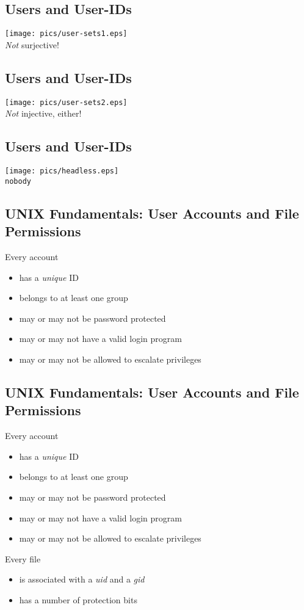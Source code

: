 \documentclass[xga]{xdvislides}
\begin{document}
\subsection{Users and User-IDs}
\begin{center}
	\texttt{[image: pics/user-sets1.eps]} \\
	{\em Not} surjective!
\end{center}

\subsection{Users and User-IDs}
\begin{center}
	\texttt{[image: pics/user-sets2.eps]} \\
	{\em Not} injective, either!
\end{center}

\subsection{Users and User-IDs}

\begin{center}
	\texttt{[image: pics/headless.eps]} \\
	{\tt nobody}
\end{center}

\subsection{UNIX Fundamentals: User Accounts and File Permissions}
Every account
\begin{itemize}
	\item has a {\em unique} ID
	\item belongs to at least one group
	\item may or may not be password protected
	\item may or may not have a valid login program
	\item may or may not be allowed to escalate privileges
\end{itemize}

\subsection{UNIX Fundamentals: User Accounts and File Permissions}
Every account
\begin{itemize}
	\item has a {\em unique} ID
	\item belongs to at least one group
	\item may or may not be password protected
	\item may or may not have a valid login program
	\item may or may not be allowed to escalate privileges
\end{itemize}
\addvspace{.5in}
Every file
\begin{itemize}
	\item is associated with a {\em uid} and a {\em gid}
	\item has a number of protection bits
\end{itemize}
\end{document}

